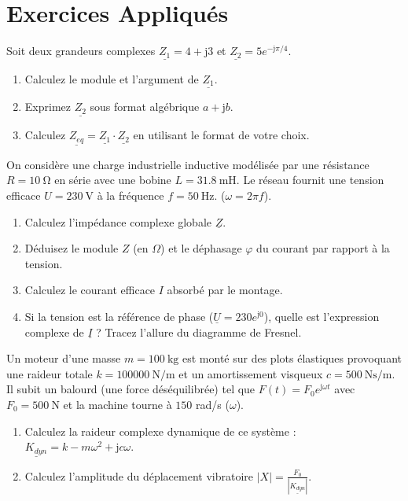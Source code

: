 \documentclass[11pt,a4paper]{article}
\newcommand{\jc}{\mathrm{j}} %
\newcommand{\cpx}[1]{\underline{#1}} %
\begin{document}
\newpage
\section{Exercices Appliqués}

\begin{exemple}
Soit deux grandeurs complexes $\cpx{Z_1} = 4 + \jc 3$ et $\cpx{Z_2} = 5 e^{-\jc \pi/4}$.
\begin{enumerate}
    \item Calculez le module et l'argument de $\cpx{Z_1}$.
    \item Exprimez $\cpx{Z_2}$ sous format algébrique $a + \jc b$.
    \item Calculez $\cpx{Z_{eq}} = \cpx{Z_1} \cdot \cpx{Z_2}$ en utilisant le format de votre choix.
\end{enumerate}
\end{exemple}

\begin{exemple}
On considère une charge industrielle inductive modélisée par une résistance $R = \SI{10}{\ohm}$ en série avec une bobine $L = \SI{31.8}{\milli\henry}$. Le réseau fournit une tension efficace $U = \SI{230}{\volt}$ à la fréquence $f = \SI{50}{\hertz}$. ($\omega = 2\pi f$).
\begin{enumerate}
    \item Calculez l'impédance complexe globale $\cpx{Z}$.
    \item Déduisez le module $Z$ (en $\Omega$) et le déphasage $\varphi$ du courant par rapport à la tension.
    \item Calculez le courant efficace $I$ absorbé par le montage.
    \item Si la tension est la référence de phase ($\cpx{U} = 230 e^{\jc 0}$), quelle est l'expression complexe de $\cpx{I}$ ? Tracez l'allure du diagramme de Fresnel.
\end{enumerate}
\end{exemple}

\begin{exemple}
Un moteur d'une masse $m=\SI{100}{\kilo\gram}$ est monté sur des plots élastiques provoquant une raideur totale $k=\SI{100000}{\newton\per\meter}$ et un amortissement visqueux $c=\SI{500}{\newton\second\per\meter}$. Il subit un balourd (une force déséquilibrée) tel que $F(t) = F_0 e^{\jc \omega t}$ avec $F_0 = \SI{500}{\newton}$ et la machine tourne à $150$ rad/s ($\omega$).
\begin{enumerate}
    \item Calculez la raideur complexe dynamique de ce système : $\cpx{K_{dyn}} = k - m\omega^2 + \jc c\omega$.
    \item Calculez l'amplitude du déplacement vibratoire $|X| = \frac{F_0}{|\cpx{K_{dyn}}|}$.
\end{enumerate}
\end{exemple}
\end{document}
